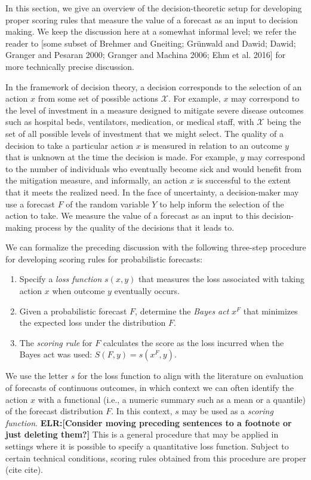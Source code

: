 \documentclass{article}
\def\elr#1{{\color{cyan}\textbf{ELR:[#1]}}}
\begin{document}
In this section, we give an overview of the decision-theoretic setup for developing proper scoring rules that measure the value of a forecast as an input to decision making. We keep the discussion here at a somewhat informal level; we refer the reader to [some subset of Brehmer and Gneiting; Grünwald and Dawid; Dawid; Granger and Pesaran 2000; Granger and Machina 2006; Ehm et al. 2016] for more technically precise discussion.

In the framework of decision theory, a decision corresponds to the selection of an action $x$ from some set of possible actions $\mathcal{X}$. For example, $x$ may correspond to the level of investment in a measure designed to mitigate severe disease outcomes such as hospital beds, ventilators, medication, or medical staff, with $\mathcal{X}$ being the set of all possible levels of investment that we might select. The quality of a decision to take a particular action $x$ is measured in relation to an outcome $y$ that is unknown at the time the decision is made. For example, $y$ may correspond to the number of individuals who eventually become sick and would benefit from the mitigation measure, and informally, an action $x$ is successful to the extent that it meets the realized need. In the face of uncertainty, a decision-maker may use a forecast $F$ of the random variable $Y$ to help inform the selection of the action to take. We measure the value of a forecast as an input to this decision-making process by the quality of the decisions that it leads to.

We can formalize the preceding discussion with the following three-step procedure for developing scoring rules for probabilistic forecasts:
\begin{enumerate}
\item Specify a \emph{loss function} $s(x, y)$ that measures the loss associated with taking action $x$ when outcome $y$ eventually occurs.
\item Given a probabilistic forecast $F$, determine the \emph{Bayes act} $x^F$ that minimizes the expected loss under the distribution $F$.
\item The \emph{scoring rule} for $F$ calculates the score as the loss incurred when the Bayes act was used: $S(F, y) = s(x^F, y)$.
\end{enumerate}
We use the letter $s$ for the loss function to align with the literature on evaluation of forecasts of continuous outcomes, in which context we can often identify the action $x$ with a functional (i.e., a numeric summary such as a mean or a quantile) of the forecast distribution $F$. In this context, $s$ may be used as a \emph{scoring function}. \elr{Consider moving preceding sentences to a footnote or just deleting them?}
This is a general procedure that may be applied in settings where it is possible to specify a quantitative loss function. Subject to certain technical conditions, scoring rules obtained from this procedure are proper (cite cite).
\end{document}

